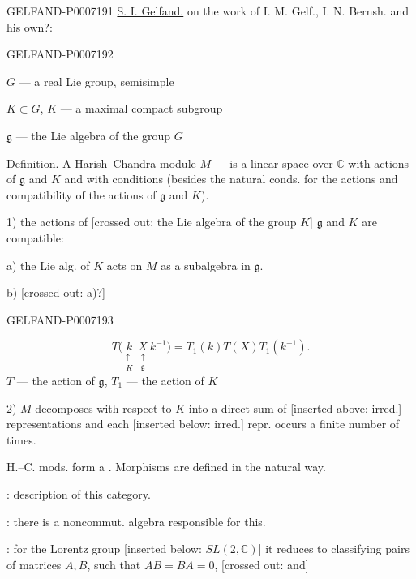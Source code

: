 \begin{GelfandAdjacentEvidence}{GELFAND-P000719}{1}
\underline{S. I. Gelfand.} on the work of I. M. Gelf., I. N. Bernsh. and his own?:
\end{GelfandAdjacentEvidence}
\begin{GelfandAdjacentEvidence}{GELFAND-P000719}{2}


\begin{flushright}
\end{flushright}

\(G\) --- a real Lie group, semisimple

\(K\subset G\), \(K\) --- a maximal compact subgroup

\(\mathfrak g\) --- the Lie algebra of the group \(G\)

\underline{Definition.} A Harish–Chandra module \(M\) ---
is a linear space over \(\mathbb C\) with actions of \(\mathfrak g\) and \(K\) and with conditions
(besides the natural conds. for the actions and compatibility of the actions of \(\mathfrak g\) and \(K\)).

1) the actions of [crossed out: the Lie algebra of the group \(K\)] \(\mathfrak g\) and \(K\) are compatible:

a) the Lie alg. of \(K\) acts on \(M\) as a subalgebra in \(\mathfrak g\).

b) [crossed out: a)?]
\end{GelfandAdjacentEvidence}
\begin{GelfandAdjacentEvidence}{GELFAND-P000719}{3}

\[
T\bigl(\underset{\substack{\uparrow\\K}}{k}\,
\underset{\substack{\uparrow\\\mathfrak g}}{X}\,k^{-1}\bigr)
=T_1(k)T(X)T_1(k^{-1}).
\]
\(T\) --- the action of \(\mathfrak g\), \(T_1\) --- the action of \(K\)

2) \(M\) decomposes with respect to \(K\) into a direct sum of [inserted above: irred.]
representations and each [inserted below: irred.] repr. occurs a finite number of times.

H.–C. mods. form a . Morphisms are defined in the natural way.

: description of this category.

: there is a noncommut. algebra responsible for this.

:
for the Lorentz group [inserted below: \(SL(2,\mathbb C)\)] it reduces to classifying pairs of matrices
\(A,B\), such that \(AB=BA=0\),
[crossed out: and]
\end{GelfandAdjacentEvidence}
